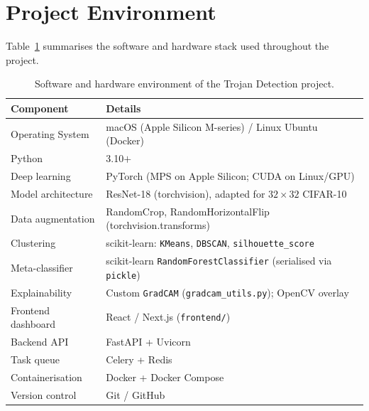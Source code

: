 \documentclass[12pt, letterpaper]{article}
\begin{document}
\FloatBarrier


\section{Project Environment}
\label{sec:environment}

Table~\ref{tab:environment} summarises the software and hardware stack used
throughout the project.

\begin{table}[!htbp]
  \centering
  \caption{Software and hardware environment of the Trojan Detection project.}
  \label{tab:environment}
  \small
  \begin{tabularx}{\linewidth}{@{} l X @{}}
    \toprule
    \textbf{Component}       & \textbf{Details} \\
    \midrule
    Operating System         & macOS (Apple Silicon M-series) / Linux Ubuntu (Docker) \\
    Python                   & 3.10$+$ \\
    Deep learning            & PyTorch (MPS on Apple Silicon; CUDA on Linux/GPU) \\
    Model architecture       & ResNet-18 (torchvision), adapted for $32\times32$ CIFAR-10 \\
    Data augmentation        & RandomCrop, RandomHorizontalFlip (torchvision.transforms) \\
    Clustering               & scikit-learn: \texttt{KMeans}, \texttt{DBSCAN}, \texttt{silhouette\_score} \\
    Meta-classifier          & scikit-learn \texttt{RandomForestClassifier} (serialised via \texttt{pickle}) \\
    Explainability           & Custom \texttt{GradCAM} (\texttt{gradcam\_utils.py}); OpenCV overlay \\
    Frontend dashboard       & React / Next.js (\texttt{frontend/}) \\
    Backend API              & FastAPI + Uvicorn \\
    Task queue               & Celery + Redis \\
    Containerisation         & Docker + Docker Compose \\
    Version control          & Git / GitHub \\
    \bottomrule
  \end{tabularx}
\end{table}
\end{document}
